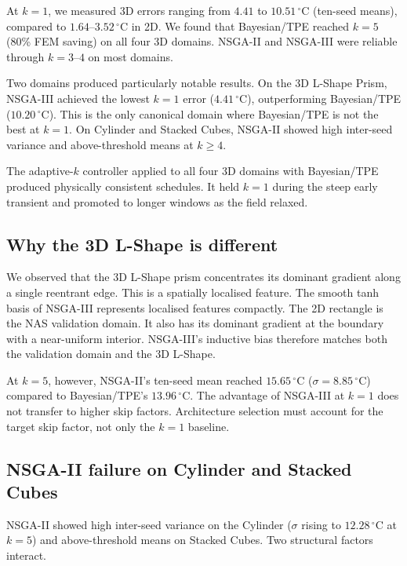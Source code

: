 At $k=1$, we measured 3D errors ranging from $4.41$ to $10.51\,^\circ\mathrm{C}$
(ten-seed means), compared to $1.64$--$3.52\,^\circ\mathrm{C}$ in 2D.
We found that Bayesian/TPE reached $k=5$ (80\% FEM saving) on all four 3D domains.
NSGA-II and NSGA-III were reliable through $k=3$--$4$ on most domains.

Two domains produced particularly notable results.
On the 3D L-Shape Prism, NSGA-III achieved the lowest $k=1$ error
($4.41\,^\circ\mathrm{C}$), outperforming Bayesian/TPE ($10.20\,^\circ\mathrm{C}$).
This is the only canonical domain where Bayesian/TPE is not the best at $k=1$.
On Cylinder and Stacked Cubes, NSGA-II showed high inter-seed variance and
above-threshold means at $k\geq4$.

The adaptive-$k$ controller applied to all four 3D domains with Bayesian/TPE
produced physically consistent schedules.
It held $k=1$ during the steep early transient and promoted to longer windows
as the field relaxed.

\subsection{Why the 3D L-Shape is different}

We observed that the 3D L-Shape prism concentrates its dominant gradient along a single
reentrant edge.
This is a spatially localised feature.
The smooth tanh basis of NSGA-III represents localised features compactly.
The 2D rectangle is the NAS validation domain.
It also has its dominant gradient at the boundary with a near-uniform interior.
NSGA-III's inductive bias therefore matches both the validation domain and the
3D L-Shape.

At $k=5$, however, NSGA-II's ten-seed mean reached $15.65\,^\circ\mathrm{C}$
($\sigma=8.85\,^\circ\mathrm{C}$) compared to Bayesian/TPE's
$13.96\,^\circ\mathrm{C}$.
The advantage of NSGA-III at $k=1$ does not transfer to higher skip factors.
Architecture selection must account for the target skip factor, not only the
$k=1$ baseline.

\subsection{NSGA-II failure on Cylinder and Stacked Cubes}

NSGA-II showed high inter-seed variance on the Cylinder ($\sigma$ rising to
$12.28\,^\circ\mathrm{C}$ at $k=5$) and above-threshold means on Stacked Cubes.
Two structural factors interact.

